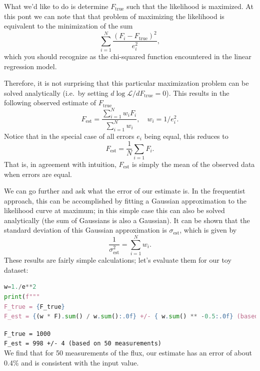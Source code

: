 \documentclass[%
oneside,                 %
final,                   %
10pt]{article}
\begin{document}
What we'd like to do is determine $F_\mathrm{true}$ such that the likelihood is maximized. At this pont we can note that that problem of maximizing the likelihood is equivalent to the minimization of the sum
\begin{equation}
\sum_{i=1}^N \frac{(F_i-F_\mathrm{true})^2}{e_i^2},
\end{equation}
which you should recognize as the chi-squared function encountered in the linear regression model.

Therefore, it is not surprising that this particular maximization problem can be solved analytically (i.e.~by setting $d\log\mathcal{L}/d F_\mathrm{true} = 0$). This results in the following observed estimate of $F_\mathrm{true}$
\begin{equation}
F_\mathrm{est} = \frac{ \sum_{i=1}^N w_i F_i }{ \sum_{i=1}^N w_i}, \quad w_i = 1/e_i^2.
\end{equation}
Notice that in the special case of all errors $e_i$ being equal, this reduces to
\begin{equation}
F_\mathrm{est} = \frac{1}{N} \sum_{i=1} F_i.
\end{equation}
That is, in agreement with intuition, $F_\mathrm{est}$ is simply the mean of the observed data when errors are equal.

We can go further and ask what the error of our estimate is. In the frequentist approach, this can be accomplished by fitting a Gaussian approximation to the likelihood curve at maximum; in this simple case this can also be solved analytically (the sum of Gaussians is also a Gaussian). It can be shown that the standard deviation of this Gaussian approximation is $\sigma_\mathrm{est}$, which is given by
\begin{equation}
\frac{ 1 } {\sigma_\mathrm{est}^2} = \sum_{i=1}^N w_i .
\end{equation}
These results are fairly simple calculations; let's evaluate them for our toy dataset:

\begin{lstlisting}[language=Python,style=blue1]
w=1./e**2
print(f"""
F_true = {F_true}
F_est = {(w * F).sum() / w.sum():.0f} +/- { w.sum() ** -0.5:.0f} (based on {N} measurements) """)
\end{lstlisting}
\Verb!F_true = 1000! \\
\Verb!F_est = 998 +/- 4 (based on 50 measurements)! \\

We find that for 50 measurements of the flux, our estimate has an error of about 0.4\% and is consistent with the input value.
\end{document}
